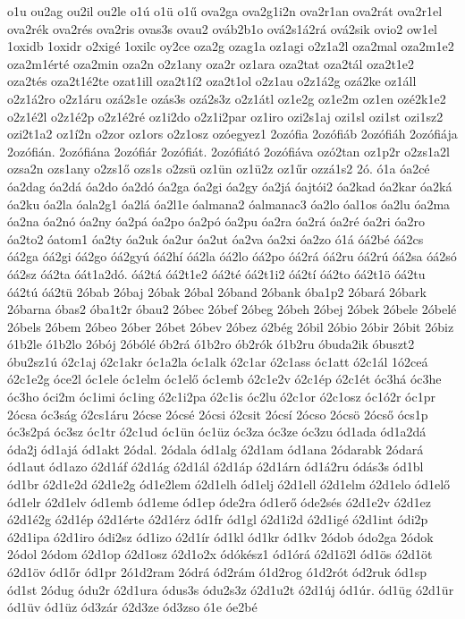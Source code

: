 {o1u
ou2ag
ou2il
ou2le
o1ú
o1ü
o1ű
ova2ga
ova2g1i2n
ova2r1an
ova2rát
ova2r1el
ova2rék
ova2rés
ova2ris
ovas3s
ovau2
ováb2b1o
ová2s1á2rá
ová2sik
ovio2
ow1el
1oxidb
1oxidr
o2xigé
1oxilc
oy2ce
oza2g
ozag1a
oz1agi
o2z1a2l
oza2mal
oza2m1e2
oza2m1érté
oza2min
oza2n
o2z1any
oza2r
oz1ara
oza2tat
oza2tál
oza2t1e2
oza2tés
oza2t1é2te
ozat1ill
oza2t1í2
oza2t1ol
o2z1au
o2z1á2g
ozá2ke
oz1áll
o2z1á2ro
o2z1áru
ozá2s1e
ozás3s
ozá2s3z
o2z1átl
oz1e2g
oz1e2m
oz1en
ozé2k1e2
o2z1é2l
o2z1é2p
o2z1é2ré
oz1i2do
o2z1i2par
oz1iro
ozi2s1aj
ozi1sl
ozi1st
ozi1sz2
ozi2t1a2
oz1í2n
o2zor
oz1ors
o2z1osz
ozóegyez1
2ozófia
2ozófiáb
2ozófiáh
2ozófiája
2ozófián.
2ozófiána
2ozófiár
2ozófiát.
2ozófiátó
2ozófiáva
ozó2tan
oz1p2r
o2zs1a2l
ozsa2n
ozs1any
o2zs1ő
ozs1s
o2zsü
oz1ün
oz1ü2z
oz1űr
ozzá1s2
2ó.
ó1a
óa2cé
óa2dag
óa2dá
óa2do
óa2dó
óa2ga
óa2gi
óa2gy
óa2já
óajtói2
óa2kad
óa2kar
óa2ká
óa2ku
óa2la
óala2g1
óa2lá
óa2l1e
óalmana2
óalmanac3
óa2lo
óal1os
óa2lu
óa2ma
óa2na
óa2nó
óa2ny
óa2pá
óa2po
óa2pó
óa2pu
óa2ra
óa2rá
óa2ré
óa2ri
óa2ro
óa2to2
óatom1
óa2ty
óa2uk
óa2ur
óa2ut
óa2va
óa2xi
óa2zo
ó1á
óá2bé
óá2cs
óá2ga
óá2gi
óá2go
óá2gyú
óá2hí
óá2la
óá2lo
óá2po
óá2rá
óá2ru
óá2rú
óá2sa
óá2só
óá2sz
óá2ta
óát1a2dó.
óá2tá
óá2t1e2
óá2té
óá2t1i2
óá2tí
óá2to
óá2t1ö
óá2tu
óá2tú
óá2tü
2óbab
2óbaj
2óbak
2óbal
2óband
2óbank
óba1p2
2óbará
2óbark
2óbarna
óbas2
óba1t2r
óbau2
2óbec
2óbef
2óbeg
2óbeh
2óbej
2óbek
2óbele
2óbelé
2óbels
2óbem
2óbeo
2óber
2óbet
2óbev
2óbez
ó2bég
2óbil
2óbio
2óbir
2óbit
2óbiz
ó1b2le
ó1b2lo
2óbój
2óbólé
ób2rá
ó1b2ro
ób2rók
ó1b2ru
óbuda2ik
óbuszt2
óbu2sz1ú
ó2c1aj
ó2c1akr
óc1a2la
óc1alk
ó2c1ar
ó2c1ass
óc1att
ó2c1ál
1ó2ceá
ó2c1e2g
óce2l
óc1ele
óc1elm
óc1elő
óc1emb
ó2c1e2v
ó2c1ép
ó2c1ét
óc3há
óc3he
óc3ho
óci2m
óc1imi
óc1ing
ó2c1i2pa
ó2c1is
óc2lu
ó2c1or
ó2c1osz
óc1ó2r
óc1pr
2ócsa
óc3ság
ó2cs1áru
2ócse
2ócsé
2ócsi
ó2csit
2ócsí
2ócso
2ócsö
2ócső
ócs1p
óc3s2pá
óc3sz
óc1tr
ó2c1ud
óc1ün
óc1üz
óc3za
óc3ze
óc3zu
ód1ada
ód1a2dá
óda2j
ód1ajá
ód1akt
2ódal.
2ódala
ód1alg
ó2d1am
ód1ana
2ódarabk
2ódará
ód1aut
ód1azo
ó2d1áf
ó2d1ág
ó2d1ál
ó2d1áp
ó2d1árn
ód1á2ru
ódás3s
ód1bl
ód1br
ó2d1e2d
ó2d1e2g
ód1e2lem
ó2d1elh
ód1elj
ó2d1ell
ó2d1elm
ó2d1elo
ód1elő
ód1elr
ó2d1elv
ód1emb
ód1eme
ód1ep
óde2ra
ód1erő
óde2sés
ó2d1e2v
ó2d1ez
ó2d1é2g
ó2d1ép
ó2d1érte
ó2d1érz
ód1fr
ód1gl
ó2d1i2d
ó2d1igé
ó2d1int
ódi2p
ó2d1ipa
ó2d1iro
ódi2sz
ód1izo
ó2d1ír
ód1kl
ód1kr
ód1kv
2ódob
ódo2ga
2ódok
2ódol
2ódom
ó2d1op
ó2d1osz
ó2d1o2x
ódókész1
ód1órá
ó2d1ö2l
ód1ös
ó2d1öt
ó2d1öv
ód1őr
ód1pr
2ó1d2ram
2ódrá
ód2rám
ó1d2rog
ó1d2rót
ód2ruk
ód1sp
ód1st
2ódug
ódu2r
ó2d1ura
ódus3s
ódu2s3z
ó2d1u2t
ó2d1új
ód1úr.
ód1üg
ó2d1ür
ód1üv
ód1üz
ód3zár
ó2d3ze
ód3zso
ó1e
óe2bé
}
